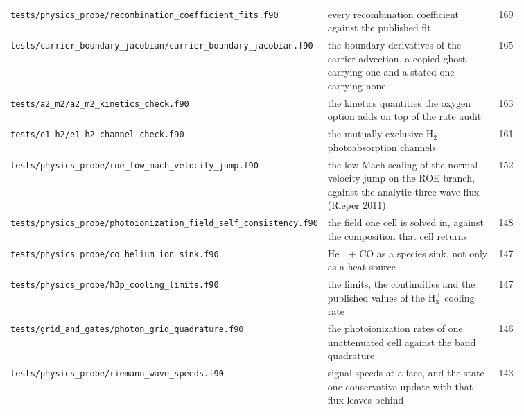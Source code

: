 {\begin{longtable}{@{}>{\raggedright\arraybackslash}p{0.36\linewidth} >{\raggedright\arraybackslash}p{0.50\linewidth} r@{}}
\texttt{tests/\allowbreak physics\_\allowbreak probe/\allowbreak recombination\_\allowbreak coefficient\_\allowbreak fits.f90} & every recombination coefficient against the published fit & 169 \\
\texttt{tests/\allowbreak carrier\_\allowbreak boundary\_\allowbreak jacobian/\allowbreak carrier\_\allowbreak boundary\_\allowbreak jacobian.f90} & the boundary derivatives of the carrier advection, a copied ghost carrying one and a stated one carrying none & 165 \\
\texttt{tests/\allowbreak a2\_\allowbreak m2/\allowbreak a2\_\allowbreak m2\_\allowbreak kinetics\_\allowbreak check.f90} & the kinetics quantities the oxygen option adds on top of the rate audit & 163 \\
\texttt{tests/\allowbreak e1\_\allowbreak h2/\allowbreak e1\_\allowbreak h2\_\allowbreak channel\_\allowbreak check.f90} & the mutually exclusive H$_2$ photoabsorption channels & 161 \\
\texttt{tests/\allowbreak physics\_\allowbreak probe/\allowbreak roe\_\allowbreak low\_\allowbreak mach\_\allowbreak velocity\_\allowbreak jump.f90} & the low-Mach scaling of the normal velocity jump on the ROE branch, against the analytic three-wave flux (Rieper 2011) & 152 \\
\texttt{tests/\allowbreak physics\_\allowbreak probe/\allowbreak photoionization\_\allowbreak field\_\allowbreak self\_\allowbreak consistency.f90} & the field one cell is solved in, against the composition that cell returns & 148 \\
\texttt{tests/\allowbreak physics\_\allowbreak probe/\allowbreak co\_\allowbreak helium\_\allowbreak ion\_\allowbreak sink.f90} & He$^+$ $+$ CO as a species sink, not only as a heat source & 147 \\
\texttt{tests/\allowbreak physics\_\allowbreak probe/\allowbreak h3p\_\allowbreak cooling\_\allowbreak limits.f90} & the limits, the continuities and the published values of the H$_3^+$ cooling rate & 147 \\
\texttt{tests/\allowbreak grid\_\allowbreak and\_\allowbreak gates/\allowbreak photon\_\allowbreak grid\_\allowbreak quadrature.f90} & the photoionization rates of one unattenuated cell against the band quadrature & 146 \\
\texttt{tests/\allowbreak physics\_\allowbreak probe/\allowbreak riemann\_\allowbreak wave\_\allowbreak speeds.f90} & signal speeds at a face, and the state one conservative update with that flux leaves behind & 143 \\

\end{longtable}}
